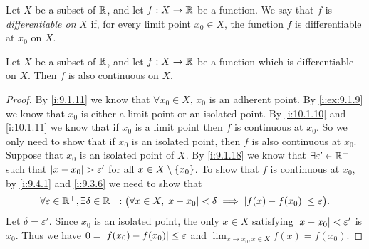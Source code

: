 \begin{defn}\label{i:10.1.11}
  Let \(X\) be a subset of \(\mathbb{R}\), and let \(f : X \to \mathbb{R}\) be a function.
  We say that \(f\) is \emph{differentiable on} \(X\) if, for every limit point \(x_0 \in X\), the function \(f\) is differentiable at \(x_0\) on \(X\).
\end{defn}

\begin{cor}\label{i:10.1.12}
  Let \(X\) be a subset of \(\mathbb{R}\), and let \(f : X \to \mathbb{R}\) be a function which is differentiable on \(X\).
  Then \(f\) is also continuous on \(X\).
\end{cor}

\begin{proof}
  By \cref{i:9.1.11} we know that \(\forall x_0 \in X\), \(x_0\) is an adherent point.
  By \cref{i:ex:9.1.9} we know that \(x_0\) is either a limit point or an isolated point.
  By \cref{i:10.1.10} and \cref{i:10.1.11} we know that if \(x_0\) is a limit point then \(f\) is continuous at \(x_0\).
  So we only need to show that if \(x_0\) is an isolated point, then \(f\) is also continuous at \(x_0\).
  Suppose that \(x_0\) is an isolated point of \(X\).
  By \cref{i:9.1.18} we know that \(\exists \varepsilon' \in \mathbb{R}^+\) such that \(\left\lvert x - x_0\right\rvert > \varepsilon'\) for all \(x \in X \setminus \left\lbrace x_0\right\rbrace\).
  To show that \(f\) is continuous at \(x_0\), by \cref{i:9.4.1} and \cref{i:9.3.6} we need to show that
  \[
    \forall \varepsilon \in \mathbb{R}^+, \exists \delta \in \mathbb{R}^+ : \big(\forall x \in X, \left\lvert x - x_0\right\rvert < \delta \implies \left\lvert f(x) - f(x_0)\right\rvert \leq \varepsilon\big).
  \]
  Let \(\delta = \varepsilon'\).
  Since \(x_0\) is an isolated point, the only \(x \in X\) satisfying \(\left\lvert x - x_0\right\rvert < \varepsilon'\) is \(x_0\).
  Thus we have \(0 = \left\lvert f(x_0) - f(x_0)\right\rvert \leq \varepsilon\) and \(\lim_{x \to x_0 ; x \in X} f(x) = f(x_0)\).
\end{proof}


